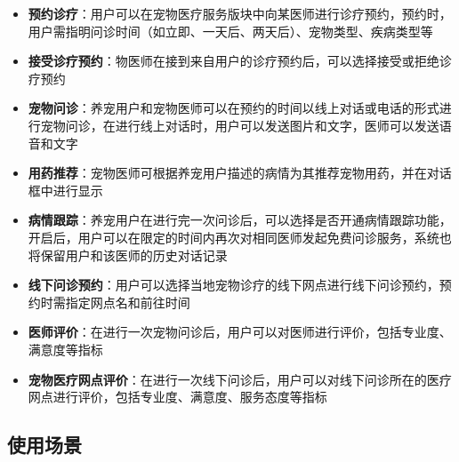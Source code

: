 \documentclass[a4paper]{ctexart}
\begin{document}
\begin{itemize}
\begin{itemize}
    \item \textbf{预约诊疗}：用户可以在宠物医疗服务版块中向某医师进行诊疗预约，预约时，用户需指明问诊时间（如立即、一天后、两天后）、宠物类型、疾病类型等
    \item \textbf{接受诊疗预约}：物医师在接到来自用户的诊疗预约后，可以选择接受或拒绝诊疗预约
    \item \textbf{宠物问诊}：养宠用户和宠物医师可以在预约的时间以线上对话或电话的形式进行宠物问诊，在进行线上对话时，用户可以发送图片和文字，医师可以发送语音和文字
    \item \textbf{用药推荐}：宠物医师可根据养宠用户描述的病情为其推荐宠物用药，并在对话框中进行显示
    \item \textbf{病情跟踪}：养宠用户在进行完一次问诊后，可以选择是否开通病情跟踪功能，开启后，用户可以在限定的时间内再次对相同医师发起免费问诊服务，系统也将保留用户和该医师的历史对话记录
    \item \textbf{线下问诊预约}：用户可以选择当地宠物诊疗的线下网点进行线下问诊预约，预约时需指定网点名和前往时间
    \item \textbf{医师评价}：在进行一次宠物问诊后，用户可以对医师进行评价，包括专业度、满意度等指标
    \item \textbf{宠物医疗网点评价}：在进行一次线下问诊后，用户可以对线下问诊所在的医疗网点进行评价，包括专业度、满意度、服务态度等指标
  \end{itemize}
\end{itemize}

\subsection{使用场景}
\end{document}
